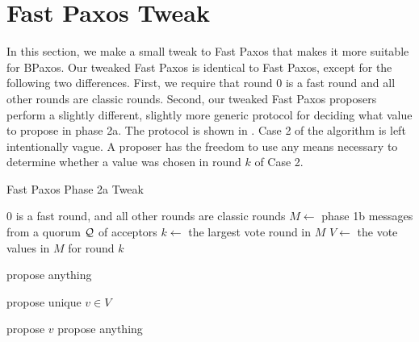 \section{Fast Paxos Tweak}
In this section, we make a small tweak to Fast Paxos that makes it more
suitable for BPaxos. Our tweaked Fast Paxos is identical to Fast Paxos, except
for the following two differences. First, we require that round $0$ is a fast
round and all other rounds are classic rounds. Second, our tweaked Fast Paxos
proposers perform a slightly different, slightly more generic protocol for
deciding what value to propose in phase 2a. The protocol is shown in
. Case 2 of the algorithm is left intentionally vague.
A proposer has the freedom to use any means necessary to determine whether a
value was chosen in round $k$ of Case 2.

\begin{algorithm}[ht]
  \caption{Fast Paxos Phase 2a Tweak}%
  \begin{algorithmic}[1]
    \Require{} $0$ is a fast round, and all other rounds are classic rounds
    \State{} $M \gets$ phase 1b messages from a quorum $\mathcal{Q}$ of acceptors
    \State{} $k \gets$ the largest vote round in $M$
    \State{} $V \gets$ the vote values in $M$ for round $k$

      \State{} propose anything
    \EndIf{}

      \State{} propose unique $v \in V$
    \EndIf{}

      \State{} propose $v$
    \Else{}
      \State{} propose anything
    \EndIf{}
  \end{algorithmic}
\end{algorithm}

